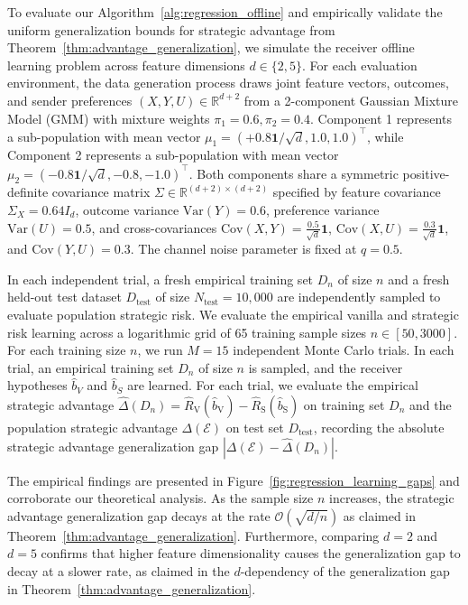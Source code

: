To evaluate our Algorithm~\ref{alg:regression_offline} and empirically validate the uniform generalization bounds for strategic advantage from Theorem~\ref{thm:advantage_generalization}, we simulate the receiver offline learning problem across feature dimensions $d \in \{2, 5\}$. For each evaluation environment, the data generation process draws joint feature vectors, outcomes, and sender preferences $(X, Y, U) \in \mathbb{R}^{d+2}$ from a 2-component Gaussian Mixture Model (GMM) with mixture weights $\pi_1 = 0.6, \pi_2 = 0.4$. Component 1 represents a sub-population with mean vector $\mu_1 = (+0.8 \mathbf{1}/\sqrt{d}, 1.0, 1.0)^\top$, while Component 2 represents a sub-population with mean vector $\mu_2 = (-0.8 \mathbf{1}/\sqrt{d}, -0.8, -1.0)^\top$. Both components share a symmetric positive-definite covariance matrix $\Sigma \in \mathbb{R}^{(d+2) \times (d+2)}$ specified by feature covariance $\Sigma_X = 0.64 I_d$, outcome variance $\mathrm{Var}(Y) = 0.6$, preference variance $\mathrm{Var}(U) = 0.5$, and cross-covariances $\mathrm{Cov}(X,Y) = \frac{0.5}{\sqrt{d}}\mathbf{1}$, $\mathrm{Cov}(X,U) = \frac{0.3}{\sqrt{d}}\mathbf{1}$, and $\mathrm{Cov}(Y,U) = 0.3$. The channel noise parameter is fixed at $q = 0.5$. 

In each independent trial, a fresh empirical training set $D_n$ of size $n$ and a fresh held-out test dataset $D_{\mathrm{test}}$ of size $N_{\mathrm{test}} = 10{,}000$ are independently sampled to evaluate population strategic risk. We evaluate the empirical vanilla and strategic risk learning across a logarithmic grid of 65 training sample sizes $n \in [50, 3000]$. For each training size $n$, we run $M = 15$ independent Monte Carlo trials. In each trial, an empirical training set $D_n$ of size $n$ is sampled, and the receiver hypotheses $\widehat{b}_V$ and $\widehat{b}_S$ are learned. For each trial, we evaluate the empirical strategic advantage $\widehat{\Delta}(D_n) = \widehat{R}_{\mathrm{V}}(\widehat{b}_{\mathrm{V}}) - \widehat{R}_{\mathrm{S}}(\widehat{b}_{\mathrm{S}})$ on training set $D_n$ and the population strategic advantage $\Delta(\mathcal{E})$ on test set $D_{\mathrm{test}}$, recording the absolute strategic advantage generalization gap $|\Delta(\mathcal{E}) - \widehat{\Delta}(D_n)|$. 

The empirical findings are presented in Figure~\ref{fig:regression_learning_gaps} and corroborate our theoretical analysis. As the sample size $n$ increases, the strategic advantage generalization gap decays at the rate $\mathcal{O}(\sqrt{d/n})$ as claimed in Theorem~\ref{thm:advantage_generalization}. Furthermore, comparing $d=2$ and $d=5$ confirms that higher feature dimensionality causes the generalization gap to decay at a slower rate, as claimed in the $d$-dependency of the generalization gap in Theorem~\ref{thm:advantage_generalization}.

